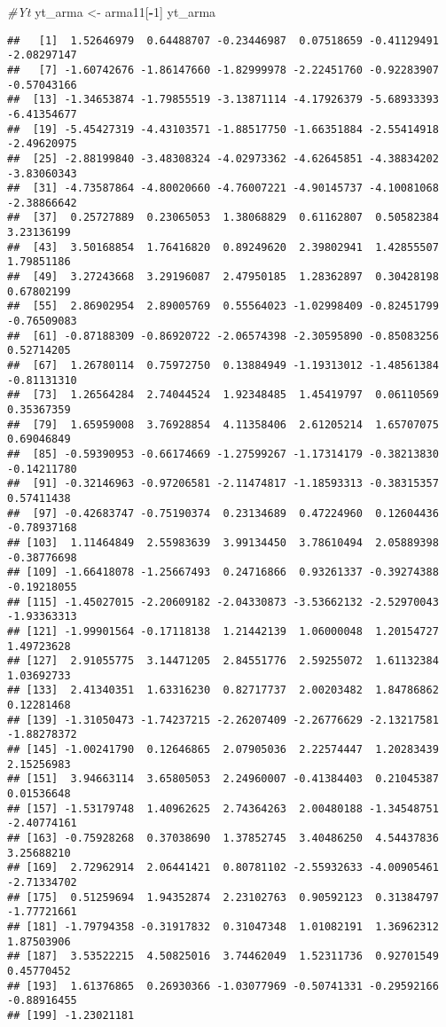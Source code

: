 \documentclass[
]{article}
\newenvironment{Shaded}{\begin{snugshade}}{\end{snugshade}}
\newcommand{\CommentTok}[1]{\textcolor[rgb]{0.56,0.35,0.01}{\textit{#1}}}
\newcommand{\DecValTok}[1]{\textcolor[rgb]{0.00,0.00,0.81}{#1}}
\newcommand{\NormalTok}[1]{#1}
\newcommand{\OtherTok}[1]{\textcolor[rgb]{0.56,0.35,0.01}{#1}}
\newcommand{\SpecialCharTok}[1]{\textcolor[rgb]{0.81,0.36,0.00}{\textbf{#1}}}
\begin{document}
\begin{Shaded}
\begin{Highlighting}[]
\CommentTok{\#Yt}
\NormalTok{yt\_arma }\OtherTok{\textless{}{-}}\NormalTok{ arma11[}\SpecialCharTok{{-}}\DecValTok{1}\NormalTok{]}
\NormalTok{yt\_arma}
\end{Highlighting}
\end{Shaded}

\begin{verbatim}
##   [1]  1.52646979  0.64488707 -0.23446987  0.07518659 -0.41129491 -2.08297147
##   [7] -1.60742676 -1.86147660 -1.82999978 -2.22451760 -0.92283907 -0.57043166
##  [13] -1.34653874 -1.79855519 -3.13871114 -4.17926379 -5.68933393 -6.41354677
##  [19] -5.45427319 -4.43103571 -1.88517750 -1.66351884 -2.55414918 -2.49620975
##  [25] -2.88199840 -3.48308324 -4.02973362 -4.62645851 -4.38834202 -3.83060343
##  [31] -4.73587864 -4.80020660 -4.76007221 -4.90145737 -4.10081068 -2.38866642
##  [37]  0.25727889  0.23065053  1.38068829  0.61162807  0.50582384  3.23136199
##  [43]  3.50168854  1.76416820  0.89249620  2.39802941  1.42855507  1.79851186
##  [49]  3.27243668  3.29196087  2.47950185  1.28362897  0.30428198  0.67802199
##  [55]  2.86902954  2.89005769  0.55564023 -1.02998409 -0.82451799 -0.76509083
##  [61] -0.87188309 -0.86920722 -2.06574398 -2.30595890 -0.85083256  0.52714205
##  [67]  1.26780114  0.75972750  0.13884949 -1.19313012 -1.48561384 -0.81131310
##  [73]  1.26564284  2.74044524  1.92348485  1.45419797  0.06110569  0.35367359
##  [79]  1.65959008  3.76928854  4.11358406  2.61205214  1.65707075  0.69046849
##  [85] -0.59390953 -0.66174669 -1.27599267 -1.17314179 -0.38213830 -0.14211780
##  [91] -0.32146963 -0.97206581 -2.11474817 -1.18593313 -0.38315357  0.57411438
##  [97] -0.42683747 -0.75190374  0.23134689  0.47224960  0.12604436 -0.78937168
## [103]  1.11464849  2.55983639  3.99134450  3.78610494  2.05889398 -0.38776698
## [109] -1.66418078 -1.25667493  0.24716866  0.93261337 -0.39274388 -0.19218055
## [115] -1.45027015 -2.20609182 -2.04330873 -3.53662132 -2.52970043 -1.93363313
## [121] -1.99901564 -0.17118138  1.21442139  1.06000048  1.20154727  1.49723628
## [127]  2.91055775  3.14471205  2.84551776  2.59255072  1.61132384  1.03692733
## [133]  2.41340351  1.63316230  0.82717737  2.00203482  1.84786862  0.12281468
## [139] -1.31050473 -1.74237215 -2.26207409 -2.26776629 -2.13217581 -1.88278372
## [145] -1.00241790  0.12646865  2.07905036  2.22574447  1.20283439  2.15256983
## [151]  3.94663114  3.65805053  2.24960007 -0.41384403  0.21045387  0.01536648
## [157] -1.53179748  1.40962625  2.74364263  2.00480188 -1.34548751 -2.40774161
## [163] -0.75928268  0.37038690  1.37852745  3.40486250  4.54437836  3.25688210
## [169]  2.72962914  2.06441421  0.80781102 -2.55932633 -4.00905461 -2.71334702
## [175]  0.51259694  1.94352874  2.23102763  0.90592123  0.31384797 -1.77721661
## [181] -1.79794358 -0.31917832  0.31047348  1.01082191  1.36962312  1.87503906
## [187]  3.53522215  4.50825016  3.74462049  1.52311736  0.92701549  0.45770452
## [193]  1.61376865  0.26930366 -1.03077969 -0.50741331 -0.29592166 -0.88916455
## [199] -1.23021181
\end{verbatim}
\end{document}
